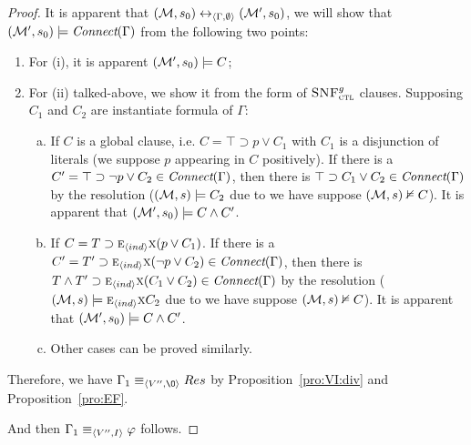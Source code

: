 \documentclass{article}
\begin{document}
\begin{proof}
It is apparent that $({\cal M}, s_0) \leftrightarrow_{{\langle{\Gamma, \emptyset}\rangle}} ({\cal M}', s_0)$, we will show that $({\cal M}', s_0) \models \emph{Connect}(\Gamma)$ from the following two points:
\begin{enumerate}[(1)]
  \item For (i), it is apparent $({\cal M}', s_0) \models C$;
  \item For (ii) talked-above, we show it from the form of ${\textsc{SNF}_{\textsc{ctl}}^g}$ clauses. Supposing $C_1$ and $C_2$ are instantiate formula of $\Gamma$:
  \begin{enumerate}[(a)]
    \item If $C$ is a global clause, i.e. $C=\top \supset p \vee C_1$ with $C_1$ is a disjunction of literals (we suppose $p$ appearing in $C$ positively). If there is a $C'=\top \supset \neg p \vee C_2 \in \emph{Connect}(\Gamma)$, then there is $\top \supset C_1 \vee C_2 \in \emph{Connect}(\Gamma)$ by the resolution ($({\cal M},s) \models C_2$ due to we have suppose $({\cal M},s) \nvDash C$). It is apparent that $({\cal M}', s_0) \models C \wedge C'$.
    \item If $C = T \supset \textsc{e}_{{\langle{ind}\rangle}}\textsc{x} (p \vee C_1)$.
        If there is a $C'=T' \supset \textsc{e}_{{\langle{ind}\rangle}}\textsc{x}( \neg p \vee C_2) \in \emph{Connect}(\Gamma)$, then there is $T\wedge T' \supset \textsc{e}_{{\langle{ind}\rangle}}\textsc{x}(C_1 \vee C_2) \in \emph{Connect}(\Gamma)$  by the resolution ($({\cal M},s) \models \textsc{e}_{{\langle{ind}\rangle}}\textsc{x} C_2$ due to we have suppose $({\cal M},s) \nvDash C$). It is apparent that $({\cal M}', s_0) \models C \wedge C'$.
    \item Other cases can be proved similarly.
  \end{enumerate}

\end{enumerate}
Therefore, we have $\Gamma_1\equiv_{\tuple{V'', {\O}}} Res$  by Proposition~\ref{pro:VI:div} and Proposition~\ref{pro:EF}.

And then $\Gamma_1 \equiv_{{\langle{V'', I}\rangle}} \varphi$ follows.
\end{proof}



\end{document}
